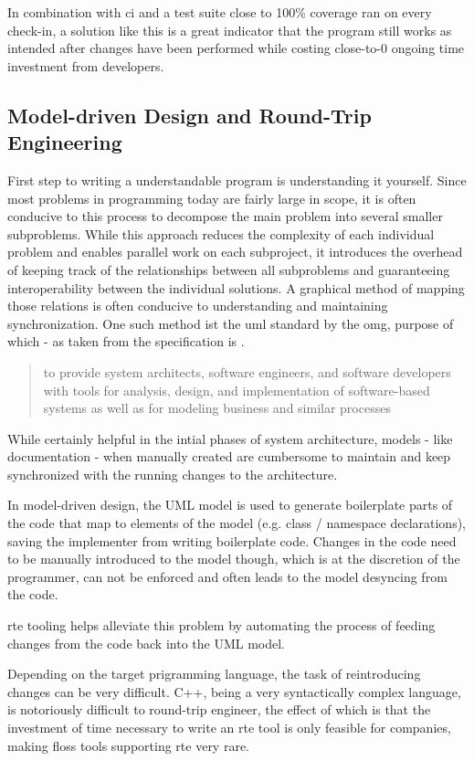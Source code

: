 In combination with \gls{ci} and a test suite close to 100\% \gls{coverage} ran on every check-in, a solution like this is a great indicator that the program still works as intended after changes have been performed while costing close-to-0 ongoing time investment from developers.

\subsection{Model-driven Design and Round-Trip Engineering}
First step to writing a understandable program is understanding it yourself. Since most problems in programming today are fairly large in scope, it is often conducive to this process to decompose the main problem into several smaller subproblems. While this approach reduces the complexity of each individual problem and enables parallel work on each subproject, it introduces the overhead of keeping track of the relationships between all subproblems and guaranteeing interoperability between the individual solutions. A graphical method of mapping those relations is often conducive to understanding and maintaining synchronization. One such method ist the \gls{uml} standard by the \gls{omg}, purpose of which - as taken from the specification is .
\begin{quote}
to provide system architects, software engineers, and software developers with tools for analysis, design, and implementation of software-based systems as well as for modeling business and similar processes
\end{quote}

While certainly helpful in the intial phases of system architecture, models - like documentation - when manually created are cumbersome to maintain and keep synchronized with the running changes to the architecture.

In model-driven design, the UML model is used to generate boilerplate parts of the code that map to elements of the model (e.g. class / namespace declarations), saving the implementer from writing boilerplate code. Changes in the code need to be manually introduced to the model though, which is at the discretion of the programmer, can not be enforced and often leads to the model desyncing from the code. 

\gls{rte} tooling helps alleviate this problem by automating the process of feeding changes from the code back into the UML model.

Depending on the target prigramming language, the task of reintroducing changes can be very difficult. C++, being a very syntactically complex language, is notoriously difficult to round-trip engineer, the effect of which is that the investment of time necessary to write an \gls{rte} tool is only feasible for companies, making \gls{floss} tools supporting \gls{rte} very rare.

